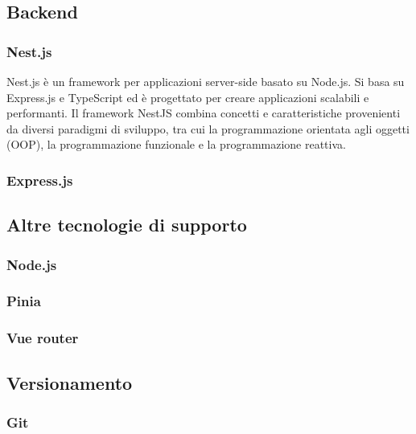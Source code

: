 \subsection{Backend}\label{subsec:backend}
\subsubsection{Nest.js}\label{subsubsec:nest}
Nest.js è un framework per applicazioni server-side basato su Node.js. Si basa su Express.js e TypeScript ed è progettato per creare applicazioni scalabili e performanti.
Il framework NestJS combina concetti e caratteristiche provenienti da diversi paradigmi di sviluppo, tra cui la programmazione orientata agli oggetti (OOP), la programmazione funzionale e la programmazione reattiva.
\subsubsection{Express.js}\label{subsubsec:express}

\subsection{Altre tecnologie di supporto}\label{subsec:altre-tecnologie-di-supporto}
\subsubsection{Node.js}\label{subsubsec:node.js}
\subsubsection{Pinia}\label{subsubsec:pinia}
\subsubsection{Vue router}\label{subsubsec:vue-router}

\subsection{Versionamento}\label{subsec:versionamento}
\subsubsection{Git}\label{subsubsec:git}
